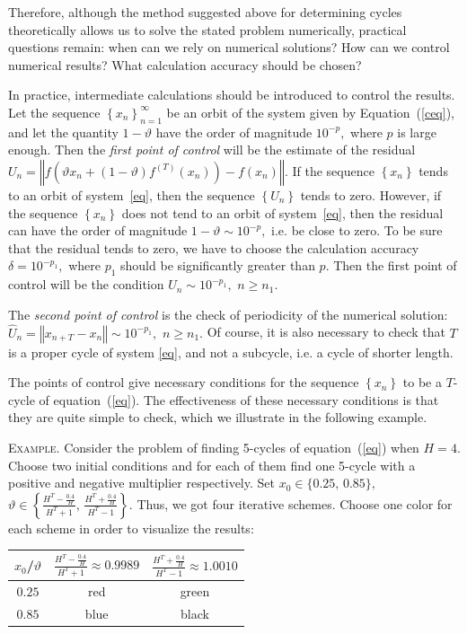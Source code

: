 \documentclass[12pt,a4paper]{amsart}
\begin{document}
Therefore, although the method suggested above for determining cycles theoretically allows us to solve 
the stated problem numerically, practical questions remain: when can we rely on numerical solutions? How can we control numerical results? 
What calculation accuracy should be chosen?

In practice, intermediate calculations should be introduced to control the results. Let the sequence $\left\{x_n\right\}_{n=1}^{\infty}$ 
be an orbit of the system given by Equation~(\ref{ceq}), and let the quantity $1-\vartheta$ have the order of magnitude $10^{-p},$ where 
$p$ is large enough. 
Then the \textit{first point of control} will be the estimate of the residual 
$U_n = \left\Vert f\left( \vartheta x_n + (1 - \vartheta) f^{(T)}(x_n)\right) - f(x_n)\right\Vert.$ If the sequence $\left\{x_n\right\}$ 
tends to an orbit of system~\eqref{eq}, then the sequence $\left\{U_n\right\}$ tends to zero. However, if the sequence 
$\left\{x_n\right\}$ does not tend to an orbit of  system~\eqref{eq}, then the residual can have the order of magnitude 
${1 - \vartheta}\sim 10^{-p},$ i.e. be close to zero. To be sure that the residual tends to zero, we have to choose the calculation 
accuracy $\delta=10^{-p_1},$ where $p_1$ should be significantly greater than $p.$ Then the first point of control will be the condition
${U_n}\sim 10^{-p_1},$ $n\geq n_1.$

The \textit{second point of control} is the check of periodicity of the numerical solution: 
$\hat{U}_n = \left\Vert x_{n+T} - x_n\right\Vert \sim 10^{-p_1},$ $n\geq n_1.$ Of course, it is also necessary to check that $T$ is a proper cycle of system \eqref{eq},
and not a subcycle, i.e. a cycle of shorter length.

The points of control give necessary conditions for the sequence $\left\{x_n\right\}$ to be a $T$-cycle 
of equation~(\ref{eq}). The effectiveness of these necessary conditions is that they are quite simple to check, which we illustrate in the following example.

\textsc{Example.} Consider the problem of finding 5-cycles of equation~(\ref{eq}) when $H=4.$ Choose two initial conditions and for each of them find one 
5-cycle with a positive and negative multiplier respectively. Set $x_0 \in \{0.25,\,0.85\},$ 
$\vartheta \in \left\{\frac{H^T - \frac{0.4}{H}}{H^T+1},\,\frac{H^T + \frac{0.4}{H}}{H^T-1} \right\}.$ Thus, we got four iterative 
schemes. Choose one color for each scheme in order to visualize the results:

\begin{center}
\begin{tabular}{c || c | c| } 
$x_0$/$\vartheta$ &  $\displaystyle{ \frac{H^T - \frac{0.4}{H}}{H^T+1}\approx 0.9989}$ & $\displaystyle{\frac{H^T + \frac{0.4}{H}}{H^T-1}\approx 1.0010}$ \\ \hline \hline
$0.25$ & red & green \\ \hline
$0.85$ & blue & black \\ \hline 
\end{tabular}
\end{center}
\end{document}
